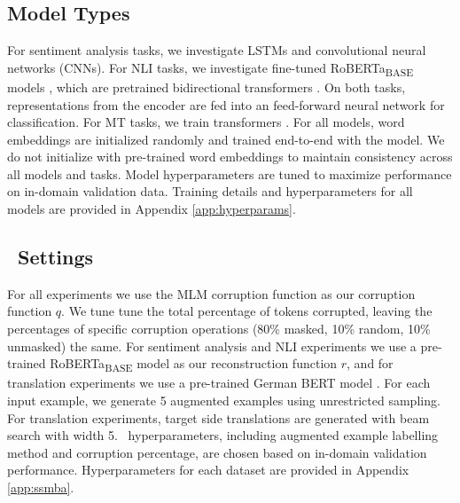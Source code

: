 \subsection{Model Types}
For sentiment analysis tasks, we investigate LSTMs \citep{hochreiter1997long} and convolutional neural networks (CNNs).
For NLI tasks, we investigate fine-tuned RoBERTa\textsubscript{BASE} models \citep{liu2019roberta}, which are pretrained bidirectional transformers \citep{vaswani2017attention}.
On both tasks, representations from the encoder are fed into an feed-forward neural network for classification.
For MT tasks, we train transformers \citep{vaswani2017attention}.
For all models, word embeddings are initialized randomly and trained end-to-end with the model.
We do not initialize with pre-trained word embeddings to maintain consistency across all models and tasks.
Model hyperparameters are tuned to maximize performance on in-domain validation data. 
Training details and hyperparameters for all models are provided in Appendix \ref{app:hyperparams}.

\subsection{\ssmba\ Settings}
For all experiments we use the MLM corruption function as our corruption function $q$.
We tune tune the total percentage of tokens corrupted, leaving the percentages of specific corruption operations (80\% masked, 10\% random, 10\% unmasked) the same.
For sentiment analysis and NLI experiments we use a pre-trained RoBERTa\textsubscript{BASE} model as our reconstruction function $r$, and for translation experiments we use a pre-trained German BERT model \citep{chan2020deepset}.
For each input example, we generate 5 augmented examples using unrestricted sampling.
For translation experiments, target side translations are generated with beam search with width 5.
\ssmba\ hyperparameters, including augmented example labelling method and corruption percentage, are chosen based on in-domain validation performance.
Hyperparameters for each dataset are provided in Appendix \ref{app:ssmba}.


